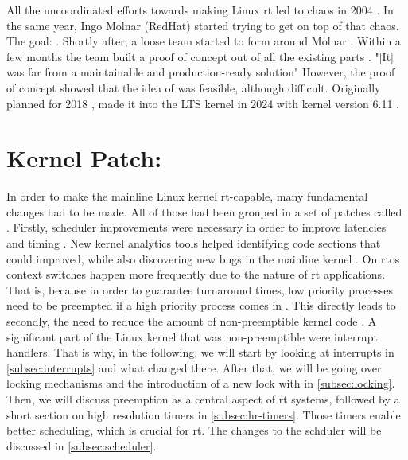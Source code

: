 \documentclass[10pt,twocolumn,a4paper]{article}
\begin{document}
\noindent All the uncoordinated efforts towards making Linux \acrshort{rt} led to chaos in 2004 \cite{perlow_trenches_2021}.
In the same year, Ingo Molnar (RedHat) started trying to get on top of that chaos.
The goal: .
Shortly after, a loose team started to form around Molnar \cite{perlow_trenches_2021}.
Within a few months the team built a proof of concept out of all the existing parts \cite{perlow_trenches_2021}.
"[It] was far from a maintainable and production-ready solution" \cite{perlow_trenches_2021}
However, the proof of concept showed that the idea of  was feasible, although difficult. \cite{perlow_trenches_2021}
Originally planned for 2018 \cite{lf:history},  made it into the LTS kernel in 2024 with kernel version 6.11 \cite{lf:versions}.

\section{Kernel Patch: }
In order to make the mainline Linux kernel \acrshort{rt}-capable, many fundamental changes had to be made.
All of those had been grouped in a set of patches called .
Firstly, scheduler improvements were necessary in order to improve latencies and timing \cite{mckenney_realtime_2005}.
New kernel analytics tools helped identifying code sections that could improved, while also discovering new bugs in the mainline kernel \cite{reghenzani_realtime_2019}.
On \acrshort{rtos} context switches happen more frequently due to the nature of \acrshort{rt} applications.
That is, because in order to guarantee turnaround times, low priority processes need to be preempted if a high priority process comes in \cite{buttazzo_hard_1997}.
This directly leads to secondly, the need to reduce the amount of non-preemptible kernel code \cite{reghenzani_realtime_2019}.
A significant part of the Linux kernel that was non-preemptible were interrupt handlers.
That is why, in the following, we will start by looking at interrupts in \autoref{subsec:interrupts} and what changed there.
After that, we will be going over locking mechanisms and the introduction of a new lock with  in \autoref{subsec:locking}.
Then, we will discuss preemption as a central aspect of \acrshort{rt} systems, followed by a short section on high resolution timers in \autoref{subsec:hr-timers}.
Those timers enable better scheduling, which is crucial for \acrshort{rt}.
The changes to the schduler will be discussed in \autoref{subsec:scheduler}.
\end{document}
